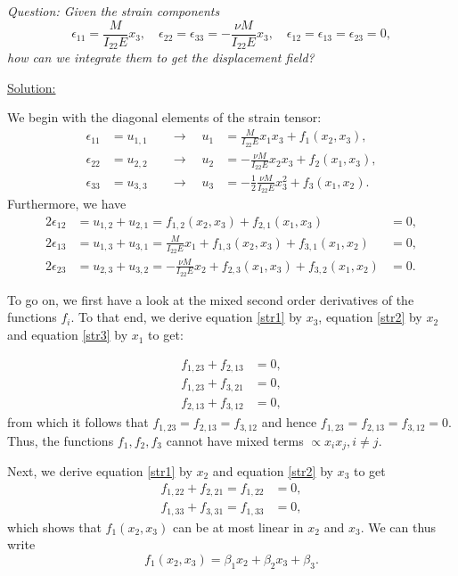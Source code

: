 \documentclass{article}
\newcommand{\ee}{\end{equation}}
\newcommand{\be}{\begin{equation}}
\begin{document}
\begin{enumerate}
\textit{Question: Given the strain components}
\be
\epsilon_{11} = \frac{M}{I_{22}E}x_3, \quad \epsilon_{22} = \epsilon_{33} = -\frac{\nu M}{I_{22}E}x_3, \quad \epsilon_{12} = \epsilon_{13} = \epsilon_{23} = 0,
\ee
\textit{how can we integrate them to get the displacement field?}

\underline{Solution:}

We begin with the diagonal elements of the strain tensor:
\begin{align}
\epsilon_{11} &= u_{1,1} \quad &\rightarrow \quad u_1 &= \frac{M}{I_{22}E}x_1x_3 + f_1(x_2,x_3), \label{u1} \\
\epsilon_{22} &= u_{2,2} \quad &\rightarrow \quad u_2 &= -\frac{\nu M}{I_{22}E}x_2x_3 + f_2(x_1,x_3),\label{u2} \\
\epsilon_{33} &= u_{3,3} \quad &\rightarrow \quad u_3 &= -\frac{1}{2}\frac{\nu M}{I_{22}E}x_3^2 + f_3(x_1,x_2). \label{u3}
\end{align}
Furthermore, we have
\begin{align}
2\epsilon_{12} &= u_{1,2} + u_{2,1} = f_{1,2}(x_2,x_3) + f_{2,1}(x_1,x_3) &= 0, \label{str1} \\
2\epsilon_{13} &= u_{1,3} + u_{3,1} = \frac{M}{I_{22}E}x_1 + f_{1,3}(x_2,x_3) + f_{3,1}(x_1,x_2)&= 0, \label{str2} \\
2\epsilon_{23} &= u_{2,3} + u_{3,2} = -\frac{\nu M}{I_{22} E}x_2 + f_{2,3}(x_1,x_3) + f_{3,2}(x_1,x_2) &= 0. \label{str3}
\end{align}

To go on, we first have a look at the mixed second order derivatives of the functions $f_i$. To that end, we derive equation \eqref{str1} by $x_3$, equation
\eqref{str2} by $x_2$ and equation \eqref{str3} by $x_1$ to get:

\begin{align}
f_{1,23} + f_{2,13} &= 0, \\
f_{1,23} + f_{3,21} &= 0, \\
f_{2,13} + f_{3,12} &= 0,
\end{align}
from which it follows that $f_{1,23} = f_{2,13} = f_{3,12}$ and hence $f_{1,23} = f_{2,13} = f_{3,12} = 0$. Thus, the functions $f_1, f_2, f_3$ cannot have
mixed terms $\propto x_ix_j, i\neq j$.

Next, we derive equation \eqref{str1} by $x_2$ and equation \eqref{str2} by $x_3$ to get
\begin{align}
f_{1,22} + f_{2,21} = f_{1,22} &= 0, \\
f_{1,33} + f_{3,31} = f_{1,33} &= 0,
\end{align}
which shows that $f_1(x_2, x_3)$ can be at most linear in $x_2$ and $x_3$. We can thus write
\be
f_1(x_2,x_3) = \beta_1 x_2 + \beta_2 x_3 + \beta_3.
\label{f_1}
\ee


\end{enumerate}
\end{document}
